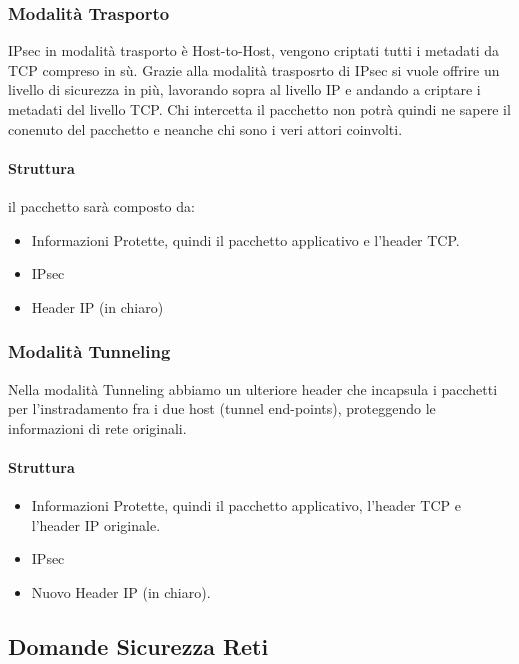 \documentclass[12pt, a4paper, openany]{book}
\begin{document}
\subsubsection{Modalità Trasporto}
IPsec in modalità trasporto è Host-to-Host, vengono criptati tutti i metadati da TCP compreso in sù.
Grazie alla modalità trasposrto di IPsec si vuole offrire un livello di sicurezza in più, lavorando sopra al livello IP e andando a criptare i metadati del livello TCP.
Chi intercetta il pacchetto non potrà quindi ne sapere il conenuto del pacchetto e neanche chi sono i veri attori coinvolti.
\paragraph*{Struttura} il pacchetto sarà composto da:
\begin{itemize}
    \item Informazioni Protette, quindi il pacchetto applicativo e l'header TCP.
    \item IPsec
    \item Header IP (in chiaro)
\end{itemize}

\subsubsection{Modalità Tunneling}
Nella modalità Tunneling abbiamo un ulteriore header che incapsula i pacchetti per l'instradamento fra i due host (tunnel end-points), proteggendo le informazioni di rete originali.

\paragraph*{Struttura}
\begin{itemize}
    \item Informazioni Protette, quindi il pacchetto applicativo, l'header TCP e l'header IP originale.
    \item IPsec
    \item Nuovo Header IP (in chiaro).
\end{itemize}



\subsection{Domande Sicurezza Reti}
\end{document}
